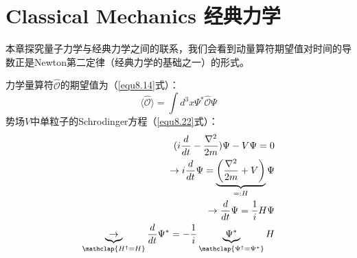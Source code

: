 







\chapter[经典力学]{Classical Mechanics \quad 经典力学}
\label{chap10}
本章探究量子力学与经典力学之间的联系，我们会看到动量算符期望值对时间的导数正是Newton第二定律（经典力学的基础之一）的形式。

力学量算符$\hat{\mathcal{O}}$的期望值为（\ref{equ8.14}式）：
\[
    \langle \hat{\mathcal{O}} \rangle = \int d^3 x \Psi^* \hat{\mathcal{O}} \Psi
\]
势场$V$中单粒子的Schrodinger方程（\ref{equ8.22}式）：
\[
\begin{split}
    (i \frac{d}{dt} - \frac{\nabla^2}{2m}) \Psi - V \Psi = 0 \\
    \to i \frac{d}{dt} \Psi = \underbrace{ \left( \frac{\nabla^2}{2m} + V \right) }_{=: H} \Psi \\
    \to \frac{d}{dt} \Psi = \frac{1}{i} H \Psi \\
    \underbrace{ \to }_{\mathclap{H^\dag = H}} \frac{d}{dt} \Psi^* = - \frac{1}{i} \underbrace{\Psi^*}_{\mathclap{\Psi^\dag = \Psi^*}} H
\end{split}
\]

